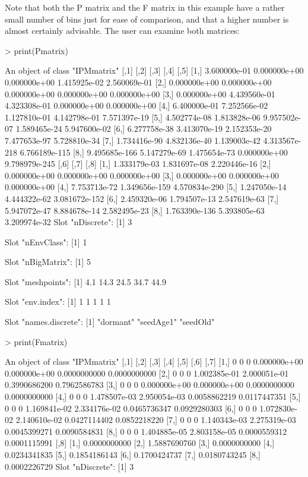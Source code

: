 \documentclass{article}
\begin{document}
Note that both the P matrix and the F matrix in this example have a rather small number of bins just for ease of comparison, and that a higher number is almost certainly advisable. The user can examine both matrices: 
\begin{Schunk}
\begin{Sinput}
> print(Pmatrix)
\end{Sinput}
\begin{Soutput}
An object of class "IPMmatrix"
              [,1]         [,2]         [,3]          [,4]          [,5]
[1,]  3.600000e-01 0.000000e+00 0.000000e+00  1.415925e-02  2.560069e-01
[2,]  0.000000e+00 0.000000e+00 0.000000e+00  0.000000e+00  0.000000e+00
[3,]  0.000000e+00 4.439560e-01 4.323308e-01  0.000000e+00  0.000000e+00
[4,]  6.400000e-01 7.252566e-02 1.127810e-01  4.142798e-01  7.571397e-19
[5,]  4.502774e-08 1.813828e-06 9.957502e-07  1.589465e-24  5.947600e-02
[6,]  6.277758e-38 3.413070e-19 2.152353e-20  7.477653e-97  5.728810e-34
[7,]  1.734416e-90 4.832136e-40 1.139003e-42 4.313567e-218 6.766189e-115
[8,] 9.495685e-166 5.147279e-69 1.475654e-73  0.000000e+00 9.798979e-245
              [,6]          [,7]          [,8]
[1,]  1.333179e-03  1.831697e-08  2.220446e-16
[2,]  0.000000e+00  0.000000e+00  0.000000e+00
[3,]  0.000000e+00  0.000000e+00  0.000000e+00
[4,]  7.753713e-72 1.349656e-159 4.570834e-290
[5,]  1.247050e-14  4.444322e-62 3.081672e-152
[6,]  2.459320e-06  1.794507e-13  2.547619e-63
[7,]  5.947072e-47  8.884678e-14  2.582495e-23
[8,] 1.763390e-136  5.393805e-63  3.209974e-32
Slot "nDiscrete":
[1] 3

Slot "nEnvClass":
[1] 1

Slot "nBigMatrix":
[1] 5

Slot "meshpoints":
[1]  4.1 14.3 24.5 34.7 44.9

Slot "env.index":
[1] 1 1 1 1 1

Slot "names.discrete":
[1] "dormant"  "seedAge1" "seedOld" 
\end{Soutput}
\begin{Sinput}
> print(Fmatrix)
\end{Sinput}
\begin{Soutput}
An object of class "IPMmatrix"
     [,1] [,2] [,3]         [,4]         [,5]         [,6]         [,7]
[1,]    0    0    0 0.000000e+00 0.000000e+00 0.0000000000 0.0000000000
[2,]    0    0    0 1.002385e-01 2.000051e-01 0.3990686200 0.7962586783
[3,]    0    0    0 0.000000e+00 0.000000e+00 0.0000000000 0.0000000000
[4,]    0    0    0 1.478507e-03 2.950054e-03 0.0058862219 0.0117447351
[5,]    0    0    0 1.169841e-02 2.334176e-02 0.0465736347 0.0929280303
[6,]    0    0    0 1.072830e-02 2.140610e-02 0.0427114402 0.0852218220
[7,]    0    0    0 1.140343e-03 2.275319e-03 0.0045399271 0.0090584831
[8,]    0    0    0 1.404885e-05 2.803158e-05 0.0000559312 0.0001115991
             [,8]
[1,] 0.0000000000
[2,] 1.5887690760
[3,] 0.0000000000
[4,] 0.0234341835
[5,] 0.1854186143
[6,] 0.1700424737
[7,] 0.0180743245
[8,] 0.0002226729
Slot "nDiscrete":
[1] 3


\end{Soutput}
\end{Schunk}
\end{document}
